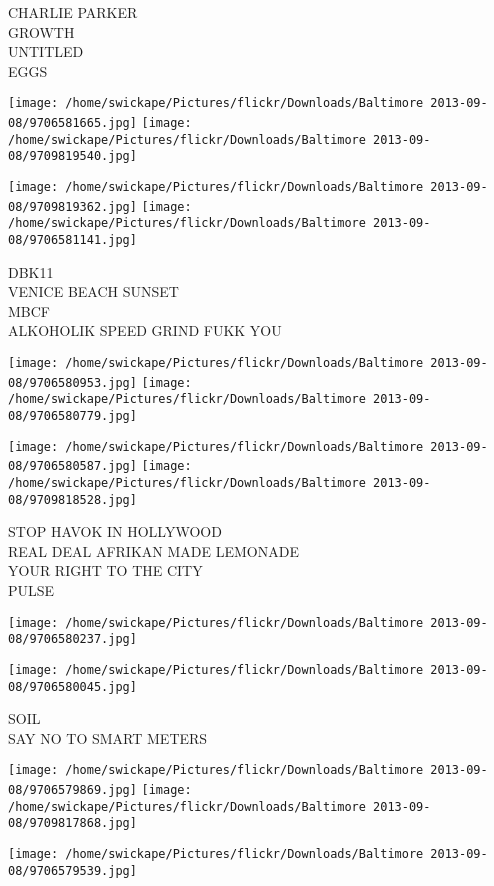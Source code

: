 \documentclass[10pt,letterpaper]{article}
\begin{document}
CHARLIE PARKER\\
GROWTH\\
UNTITLED\\
EGGS
\pagebreak

\texttt{[image: /home/swickape/Pictures/flickr/Downloads/Baltimore 2013-09-08/9706581665.jpg]}
\texttt{[image: /home/swickape/Pictures/flickr/Downloads/Baltimore 2013-09-08/9709819540.jpg]}

\texttt{[image: /home/swickape/Pictures/flickr/Downloads/Baltimore 2013-09-08/9709819362.jpg]}
\texttt{[image: /home/swickape/Pictures/flickr/Downloads/Baltimore 2013-09-08/9706581141.jpg]}

DBK11\\
VENICE BEACH SUNSET\\
MBCF\\
ALKOHOLIK SPEED GRIND FUKK YOU
\pagebreak

\texttt{[image: /home/swickape/Pictures/flickr/Downloads/Baltimore 2013-09-08/9706580953.jpg]}
\texttt{[image: /home/swickape/Pictures/flickr/Downloads/Baltimore 2013-09-08/9706580779.jpg]}

\texttt{[image: /home/swickape/Pictures/flickr/Downloads/Baltimore 2013-09-08/9706580587.jpg]}
\texttt{[image: /home/swickape/Pictures/flickr/Downloads/Baltimore 2013-09-08/9709818528.jpg]}

STOP HAVOK IN HOLLYWOOD\\
REAL DEAL AFRIKAN MADE LEMONADE\\
YOUR RIGHT TO THE CITY\\
PULSE
\pagebreak

\texttt{[image: /home/swickape/Pictures/flickr/Downloads/Baltimore 2013-09-08/9706580237.jpg]}

\vspace{0.25in}
\texttt{[image: /home/swickape/Pictures/flickr/Downloads/Baltimore 2013-09-08/9706580045.jpg]}

SOIL\\
SAY NO TO SMART METERS
\pagebreak

\texttt{[image: /home/swickape/Pictures/flickr/Downloads/Baltimore 2013-09-08/9706579869.jpg]}
\texttt{[image: /home/swickape/Pictures/flickr/Downloads/Baltimore 2013-09-08/9709817868.jpg]}

\texttt{[image: /home/swickape/Pictures/flickr/Downloads/Baltimore 2013-09-08/9706579539.jpg]}
\end{document}
